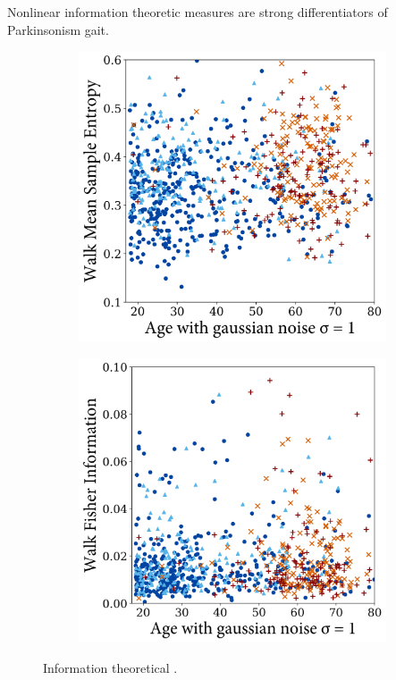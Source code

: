 \documentclass[12pt, twoside]{book}
\begin{document}
Nonlinear information theoretic measures are strong differentiators of Parkinsonism gait. 


\begin{figure}[h]
	\centering
	\begin{subfigure}{.42\textwidth}
		\centering
		\includegraphics[width=0.96\linewidth]{walk_samp_ent.png}
	\end{subfigure}%
	\begin{subfigure}{.42\textwidth}
		\centering
		\includegraphics[width=0.96\linewidth]{walk_fisher.png}
	\end{subfigure}
	\caption{Information theoretical . }
	\label{infodynamicwalk}
\end{figure}
\end{document}
